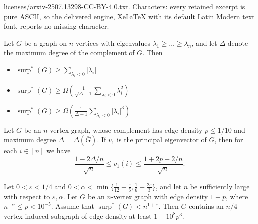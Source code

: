 \documentclass[10pt,a4paper]{amsart}
\DeclareMathOperator{\surp}{surp}
\newcommand{\eps}{\varepsilon}
\begin{document}
licenses/arxiv-2507.13298-CC-BY-4.0.txt. Characters: every retained excerpt is pure ASCII, so the delivered engine, XeLaTeX with its default Latin Modern text font, reports no missing character.
\begin{lemma}\label{lemma:surp_star}
Let $G$ be a graph on $n$ vertices with eigenvalues $\lambda_1\geq \dots\geq \lambda_n$, and let $\Delta$ denote the maximum degree of the complement of $G$. Then
\begin{itemize}
    \item[(i)] $\surp^*(G)\geq \sum_{\lambda_i<0}|\lambda_i|$
    \item[(ii)] $\surp^*(G)\geq \Omega\left(\frac{1}{\sqrt{\Delta+1}}\sum_{\lambda_i<0}\lambda_i^2\right)$
    \item[(iii)]  $\surp^*(G)\geq \Omega\left(\frac{1}{\Delta+1}\sum_{\lambda_i<0}|\lambda_i|^3\right)$
\end{itemize}
\end{lemma}

\begin{lemma}\label{lemma:max_entry}
Let $G$ be an $n$-vertex graph, whose complement has edge density $p\leq 1/10$ and maximum degree $\Delta=\Delta(\overline{G})$. If $v_1$ is the principal eigenvector of $G$, then for each $i\in [n]$ we have \[\frac{1-2\Delta/n}{\sqrt{n}} \leq v_1(i)\leq \frac{1+2p+2/n}{\sqrt{n}}.\]
\end{lemma}

\begin{lemma}\label{lemma:density_increment}
Let $0<\eps<1/4$ and $0<\alpha<\min\{\frac{1}{12}-\frac{\eps}{6},\frac{1}{6}-\frac{2\eps}{3}\}$, and let $n$ be sufficiently large with respect to $\eps,\alpha$. Let $G$ be an $n$-vertex graph with edge density $1-p$, where $n^{-\alpha}\leq p<10^{-5}$. Assume that $\surp^*(G)<n^{1+\eps}$. Then $G$ contains an $n/4$-vertex induced subgraph of edge density at least $1-10^8 p^3$.
\end{lemma}
\end{document}
